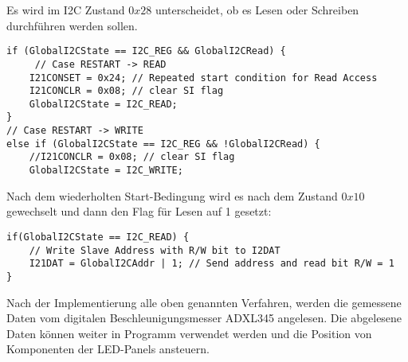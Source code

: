 Es wird im I2C Zustand $0x28$ unterscheidet, ob es Lesen oder Schreiben durchführen werden sollen.
\begin{lstlisting}
if (GlobalI2CState == I2C_REG && GlobalI2CRead) {
     // Case RESTART -> READ
	I21CONSET = 0x24; // Repeated start condition for Read Access
	I21CONCLR = 0x08; // clear SI flag
	GlobalI2CState = I2C_READ;
}
// Case RESTART -> WRITE
else if (GlobalI2CState == I2C_REG && !GlobalI2CRead) {
	//I21CONCLR = 0x08; // clear SI flag
	GlobalI2CState = I2C_WRITE;
\end{lstlisting}

Nach dem wiederholten Start-Bedingung wird es nach dem Zustand $0x10$ gewechselt und dann den Flag für Lesen auf 1 gesetzt:
\begin{lstlisting}
if(GlobalI2CState == I2C_READ) {
	// Write Slave Address with R/W bit to I2DAT
	I21DAT = GlobalI2CAddr | 1; // Send address and read bit R/W = 1
}
\end{lstlisting}

Nach der Implementierung alle oben genannten Verfahren, werden die gemessene Daten vom digitalen Beschleunigungsmesser ADXL345 angelesen. Die abgelesene Daten können weiter in Programm verwendet werden und die Position von Komponenten der LED-Panels ansteuern.

